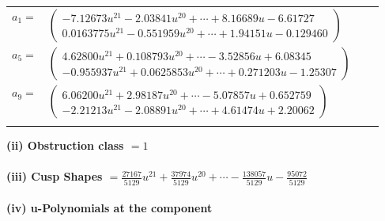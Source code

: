 \documentclass[1p]{elsarticle_modified}
\theoremstyle{definition}
\begin{document}
\begin{tabular}{m{7pt} m{180pt} m{7pt} m{180pt} }
\flushright $a_{1}=$&$\begin{pmatrix}-7.12673 u^{21}-2.03841 u^{20}+\cdots+8.16689 u-6.61727\\0.0163775 u^{21}-0.551959 u^{20}+\cdots+1.94151 u-0.129460\end{pmatrix}$ \\
\flushright $a_{5}=$&$\begin{pmatrix}4.62800 u^{21}+0.108793 u^{20}+\cdots-3.52856 u+6.08345\\-0.955937 u^{21}+0.0625853 u^{20}+\cdots+0.271203 u-1.25307\end{pmatrix}$ \\
\flushright $a_{9}=$&$\begin{pmatrix}6.06200 u^{21}+2.98187 u^{20}+\cdots-5.07857 u+0.652759\\-2.21213 u^{21}-2.08891 u^{20}+\cdots+4.61474 u+2.20062\end{pmatrix}$\\&\end{tabular}
\flushleft \textbf{(ii) Obstruction class $= 1$}\\~\\
\flushleft \textbf{(iii) Cusp Shapes $= \frac{27167}{5129} u^{21}+\frac{37974}{5129} u^{20}+\cdots-\frac{138057}{5129} u-\frac{95072}{5129}$}\\~\\
\newpage\renewcommand{\arraystretch}{1}
\flushleft \textbf{(iv) u-Polynomials at the component}\newline \\
\end{document}
